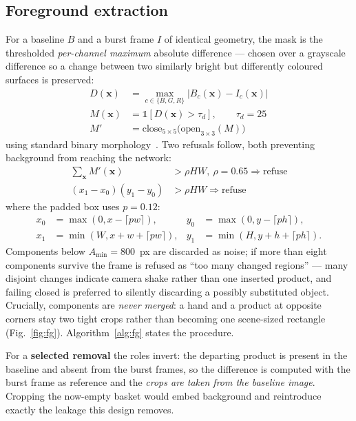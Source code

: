 \documentclass[conference]{IEEEtran}
\begin{document}
\subsection{Foreground extraction}
For a baseline $B$ and a burst frame $I$ of identical geometry, the mask is the thresholded
\emph{per-channel maximum} absolute difference --- chosen over a grayscale difference so a change
between two similarly bright but differently coloured surfaces is preserved:
\begin{align}
D(\mathbf{x}) &= \max_{c\in\{B,G,R\}}\big|B_c(\mathbf{x})-I_c(\mathbf{x})\big|\\
M(\mathbf{x}) &= \mathbb{1}\!\left[D(\mathbf{x})>\tau_d\right],\qquad \tau_d = 25\\
M' &= \mathrm{close}_{5\times5}\!\big(\mathrm{open}_{3\times3}(M)\big)
\end{align}
using standard binary morphology~\cite{R66}. Two refusals follow, both preventing background from
reaching the network:
\begin{align}
\textstyle\sum_{\mathbf{x}} M'(\mathbf{x}) &> \rho H W,\ \rho=0.65 \Rightarrow \text{refuse}\\
(x_1{-}x_0)(y_1{-}y_0) &> \rho H W \Rightarrow \text{refuse}
\end{align}
where the padded box uses $p=0.12$:
\begin{equation}
\begin{aligned}
x_0 &= \max(0,x{-}\lceil pw\rceil), & y_0 &= \max(0,y{-}\lceil ph\rceil),\\
x_1 &= \min(W,x{+}w{+}\lceil pw\rceil), & y_1 &= \min(H,y{+}h{+}\lceil ph\rceil).
\end{aligned}
\end{equation}
Components below $A_{\min}=800$~px are discarded as noise; if more than eight components survive the
frame is refused as ``too many changed regions'' --- many disjoint changes indicate camera shake rather
than one inserted product, and failing closed is preferred to silently discarding a possibly
substituted object. Crucially, components are \emph{never merged}: a hand and a product at opposite
corners stay two tight crops rather than becoming one scene-sized rectangle (Fig.~\ref{fig:fg}).
Algorithm~\ref{alg:fg} states the procedure.

For a \textbf{selected removal} the roles invert: the departing product is present in the baseline and
absent from the burst frames, so the difference is computed with the burst frame as reference and the
\emph{crops are taken from the baseline image}. Cropping the now-empty basket would embed background
and reintroduce exactly the leakage this design removes.
\end{document}
